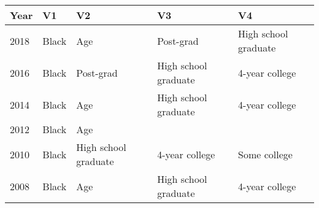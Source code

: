 \begin{tabular}{lllll}
  \toprule
Year & V1 & V2 & V3 & V4 \\ 
  \midrule
2018 & Black & Age & Post-grad & High school graduate \\ 
  2016 & Black & Post-grad & High school graduate & 4-year college \\ 
  2014 & Black & Age & High school graduate & 4-year college \\ 
  2012 & Black & Age &  &  \\ 
  2010 & Black & High school graduate & 4-year college & Some college \\ 
  2008 & Black & Age & High school graduate & 4-year college \\ 
   \bottomrule
\end{tabular}
